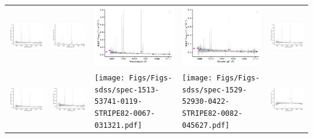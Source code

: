 \begin{center}
\begin{longtable}{l l l l l }
    \includegraphics[width=0.19\linewidth, clip]{Figs/Figs-sdss/spec-1509-52942-0633-STRIPE82-0058-020465.pdf} & \includegraphics[width=0.19\linewidth, clip]{Figs/Figs-sdss/spec-1511-52946-0192-STRIPE82-0059-038994.pdf} & \includegraphics[width=0.19\linewidth, clip]{Figs/Figs-sdss/spec-1512-53742-0281-STRIPE82-0061-012261.pdf} & \includegraphics[width=0.19\linewidth, clip]{Figs/Figs-sdss/spec-1512-53742-0296-STRIPE82-0061-011773.pdf} & \includegraphics[width=0.19\linewidth, clip]{Figs/Figs-sdss/spec-1512-53742-0351-STRIPE82-0061-059714.pdf} \\
    \includegraphics[width=0.19\linewidth, clip]{Figs/Figs-sdss/spec-1512-53742-0430-STRIPE82-0064-022463.pdf} & \includegraphics[width=0.19\linewidth, clip]{Figs/Figs-sdss/spec-1512-53742-0471-STRIPE82-0064-008459.pdf} & \texttt{[image: Figs/Figs-sdss/spec-1513-53741-0119-STRIPE82-0067-031321.pdf]} & \texttt{[image: Figs/Figs-sdss/spec-1529-52930-0422-STRIPE82-0082-045627.pdf]} & \includegraphics[width=0.19\linewidth, clip]{Figs/Figs-sdss/spec-1558-53271-0059-STRIPE82-0053-022298.pdf} \\

\end{longtable}
\end{center}
